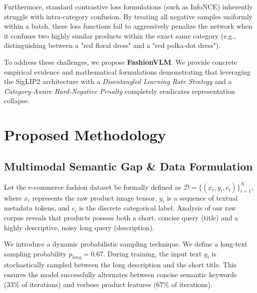 \documentclass[12pt, a4paper]{article}
\begin{document}
Furthermore, standard contrastive loss formulations (such as InfoNCE) inherently struggle with intra-category confusion. By treating all negative samples uniformly within a batch, these loss functions fail to aggressively penalize the network when it confuses two highly similar products within the exact same category (e.g., distinguishing between a "red floral dress" and a "red polka-dot dress").

To address these challenges, we propose \textbf{FashionVLM}. We provide concrete empirical evidence and mathematical formulations demonstrating that leveraging the SigLIP2 architecture with a \textit{Disentangled Learning Rate Strategy} and a \textit{Category-Aware Hard-Negative Penalty} completely eradicates representation collapse.

\section{Proposed Methodology}

\subsection{Multimodal Semantic Gap \& Data Formulation}
Let the e-commerce fashion dataset be formally defined as $\mathcal{D} = \{(x_i, y_i, c_i)\}_{i=1}^N$, where $x_i$ represents the raw product image tensor, $y_i$ is a sequence of textual metadata tokens, and $c_i$ is the discrete categorical label. Analysis of our raw corpus reveals that products possess both a short, concise query (title) and a highly descriptive, noisy long query (description). 

We introduce a dynamic probabilistic sampling technique. We define a long-text sampling probability $p_{long} = 0.67$. During training, the input text $y_i$ is stochastically sampled between the long description and the short title. This ensures the model successfully alternates between concise semantic keywords (33\% of iterations) and verbose product features (67\% of iterations).
\end{document}
